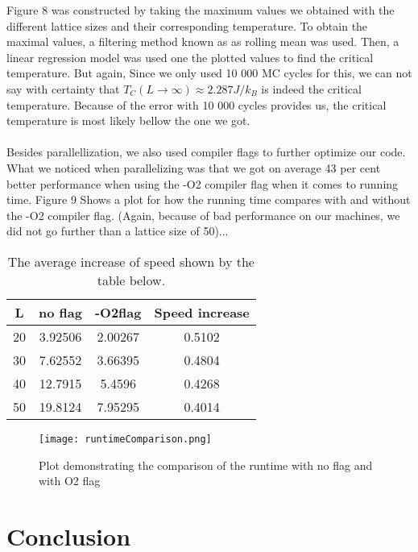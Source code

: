 \documentclass{article}
\begin{document}
Figure 8 was constructed by taking the maximum values we obtained with the different lattice sizes and their corresponding temperature. To obtain the maximal values, a filtering method known as as rolling mean was used. Then, a linear regression model was used one the plotted values to find the critical temperature. But again, Since we only used 10 000 MC cycles for this, we can not say with certainty that $T_C(L\to\infty) \approx 2.287 J/k_B$ is indeed the critical temperature. Because of the error with 10 000 cycles provides us, the critical temperature is most likely bellow the one we got. \\ \\ 

Besides parallellization, we also used compiler flags to further optimize our code. What we noticed when parallelizing was that we got on average 43 per cent better performance when using the -O2 compiler flag when it comes to running time. Figure 9 Shows a plot for how the running time compares with and without the -O2 compiler flag. (Again, because of bad performance on our machines, we did not go further than a lattice size of 50)...



		\begin{table}[h]
			\centering
			\caption{The average increase of speed shown by the table below.}
			\label{table: Error results Gauss-Quarature}
			\begin{tabular}{|c|c|c|c|}
\hline
\textbf{L} 	&	\textbf{no flag}	&	\textbf{-O2flag} & \textbf{Speed increase} \\\hline 
20  &  3.92506  &  2.00267   &       0.5102 \\\hline 
30   &  7.62552  &  3.66395    &      0.4804 \\\hline 
40   &  12.7915  &  5.4596   &        0.4268 \\\hline 
50   &  19.8124 &  7.95295   &        0.4014 \\\hline
			\end{tabular}
		\end{table}


\begin{figure}[H]
	\centering
	\texttt{[image: runtimeComparison.png]}
	\centering
	\caption{ Plot demonstrating the comparison of the runtime with no flag and with O2 flag  }
	\label{fig: integration limits Gauss-Legendre}
\end{figure}


\section{Conclusion}
\end{document}
